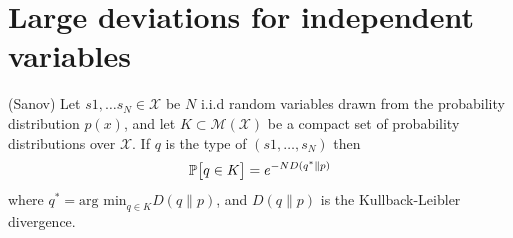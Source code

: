 \documentclass[letterpaper,english,10pt]{article}
\begin{document}
  \section{Large deviations for independent variables}
  \begin{thm}(Sanov) Let $s1,\dots s_N\in\mathcal{X}$ be $N$ i.i.d random variables drawn from the probability distribution $p(x)$, and let $K\subset \mathcal{M(X)}$ be a compact set of probability distributions over $\mathcal{X}$. If $q$ is the type of $(s1,\dots,s_N)$ then
  \begin{equation}
      \P\big[q\in K\big]= e^{-ND(q^*\parallel p)}
  \end{equation}
  where $q^* = \text{arg min}_{q\in K}D(q\parallel p)$, and $D(q\parallel p)$ is the Kullback-Leibler divergence.
  \end{thm}
  
 
\end{document}
